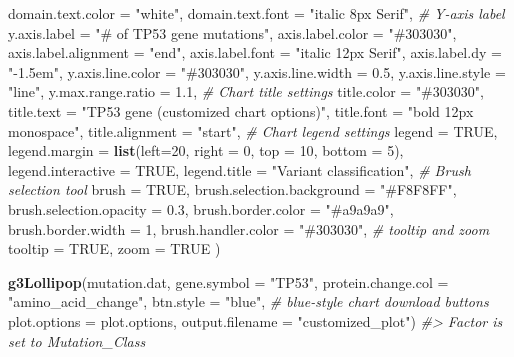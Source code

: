 \documentclass[
]{article}
\newenvironment{Shaded}{\begin{snugshade}}{\end{snugshade}}
\newcommand{\AttributeTok}[1]{\textcolor[rgb]{0.13,0.29,0.53}{#1}}
\newcommand{\CommentTok}[1]{\textcolor[rgb]{0.56,0.35,0.01}{\textit{#1}}}
\newcommand{\ConstantTok}[1]{\textcolor[rgb]{0.56,0.35,0.01}{#1}}
\newcommand{\DecValTok}[1]{\textcolor[rgb]{0.00,0.00,0.81}{#1}}
\newcommand{\FloatTok}[1]{\textcolor[rgb]{0.00,0.00,0.81}{#1}}
\newcommand{\FunctionTok}[1]{\textcolor[rgb]{0.13,0.29,0.53}{\textbf{#1}}}
\newcommand{\NormalTok}[1]{#1}
\newcommand{\StringTok}[1]{\textcolor[rgb]{0.31,0.60,0.02}{#1}}
\begin{document}
\begin{Shaded}
\begin{Highlighting}[]
  \AttributeTok{domain.text.color =} \StringTok{"white"}\NormalTok{,}
  \AttributeTok{domain.text.font =} \StringTok{"italic 8px Serif"}\NormalTok{,}
  \CommentTok{\# Y{-}axis label}
  \AttributeTok{y.axis.label =} \StringTok{"\# of TP53 gene mutations"}\NormalTok{,}
  \AttributeTok{axis.label.color =} \StringTok{"\#303030"}\NormalTok{,}
  \AttributeTok{axis.label.alignment =} \StringTok{"end"}\NormalTok{,}
  \AttributeTok{axis.label.font =} \StringTok{"italic 12px Serif"}\NormalTok{,}
  \AttributeTok{axis.label.dy =} \StringTok{"{-}1.5em"}\NormalTok{,}
  \AttributeTok{y.axis.line.color =} \StringTok{"\#303030"}\NormalTok{,}
  \AttributeTok{y.axis.line.width =} \FloatTok{0.5}\NormalTok{,}
  \AttributeTok{y.axis.line.style =} \StringTok{"line"}\NormalTok{,}
  \AttributeTok{y.max.range.ratio =} \FloatTok{1.1}\NormalTok{,}
  \CommentTok{\# Chart title settings}
  \AttributeTok{title.color =} \StringTok{"\#303030"}\NormalTok{,}
  \AttributeTok{title.text =} \StringTok{"TP53 gene (customized chart options)"}\NormalTok{,}
  \AttributeTok{title.font =} \StringTok{"bold 12px monospace"}\NormalTok{,}
  \AttributeTok{title.alignment =} \StringTok{"start"}\NormalTok{,}
  \CommentTok{\# Chart legend settings}
  \AttributeTok{legend =} \ConstantTok{TRUE}\NormalTok{,}
  \AttributeTok{legend.margin =} \FunctionTok{list}\NormalTok{(}\AttributeTok{left=}\DecValTok{20}\NormalTok{, }\AttributeTok{right =} \DecValTok{0}\NormalTok{, }\AttributeTok{top =} \DecValTok{10}\NormalTok{, }\AttributeTok{bottom =} \DecValTok{5}\NormalTok{),}
  \AttributeTok{legend.interactive =} \ConstantTok{TRUE}\NormalTok{,}
  \AttributeTok{legend.title =} \StringTok{"Variant classification"}\NormalTok{,}
  \CommentTok{\# Brush selection tool}
  \AttributeTok{brush =} \ConstantTok{TRUE}\NormalTok{,}
  \AttributeTok{brush.selection.background =} \StringTok{"\#F8F8FF"}\NormalTok{,}
  \AttributeTok{brush.selection.opacity =} \FloatTok{0.3}\NormalTok{,}
  \AttributeTok{brush.border.color =} \StringTok{"\#a9a9a9"}\NormalTok{,}
  \AttributeTok{brush.border.width =} \DecValTok{1}\NormalTok{,}
  \AttributeTok{brush.handler.color =} \StringTok{"\#303030"}\NormalTok{,}
  \CommentTok{\# tooltip and zoom}
  \AttributeTok{tooltip =} \ConstantTok{TRUE}\NormalTok{,}
  \AttributeTok{zoom =} \ConstantTok{TRUE}
\NormalTok{)}

\FunctionTok{g3Lollipop}\NormalTok{(mutation.dat,}
           \AttributeTok{gene.symbol =} \StringTok{"TP53"}\NormalTok{,}
           \AttributeTok{protein.change.col =} \StringTok{"amino\_acid\_change"}\NormalTok{,}
           \AttributeTok{btn.style =} \StringTok{"blue"}\NormalTok{, }\CommentTok{\# blue{-}style chart download buttons}
           \AttributeTok{plot.options =}\NormalTok{ plot.options,}
           \AttributeTok{output.filename =} \StringTok{"customized\_plot"}\NormalTok{)}
\CommentTok{\#\textgreater{} Factor is set to Mutation\_Class}
\end{Highlighting}
\end{Shaded}
\end{document}
